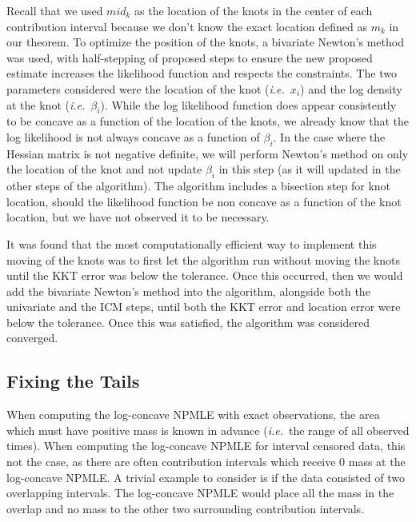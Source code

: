 	Recall that we used $mid_k$ as the location of the knots in the center of each contribution interval because we don't know the exact location defined as $m_k$ in our theorem. To optimize the position of the knots, a bivariate Newton's method was used, with half-stepping of proposed steps to ensure the new proposed estimate increases the likelihood function and respects the constraints. The two parameters considered were the location of the knot (\emph{i.e.}\ $x_i$) and the log density at the knot (\emph{i.e.}\ $\beta_i$). While the log likelihood function does appear consistently to be concave as a function of the location of the knots, we already know that the log likelihood is not always concave as a function of $\beta_i$. In the case where the Hessian matrix is not negative definite, we will perform Newton's method on only the location of the knot and not update $\beta_i$ in this step (as it will updated in the other steps of the algorithm). The algorithm includes a bisection step for knot location, should the likelihood function be non concave as a function of the knot location, but we have not observed it to be necessary. 
	
	It was found that the most computationally efficient way to implement this moving of the knots was to first let the algorithm run without moving the knots until the KKT error was below the tolerance. Once this occurred, then we would add the bivariate Newton's method into the algorithm, alongside both the univariate and the ICM steps, until both the KKT error and location error were below the tolerance. Once this was satisfied, the algorithm was considered converged. 
	
		{\subsection{Fixing the Tails} }
	
	When computing the log-concave NPMLE with exact observations, the area which must have positive mass is known in advance (\emph{i.e.}\ the range of all observed times). When computing the log-concave NPMLE for interval censored data, this not the case, as there are often contribution intervals which receive 0 mass at the log-concave NPMLE. A trivial example to consider is if the data consisted of two overlapping intervals. The log-concave NPMLE would place all the mass in the overlap and no mass to the other two surrounding contribution intervals.%
	 		

